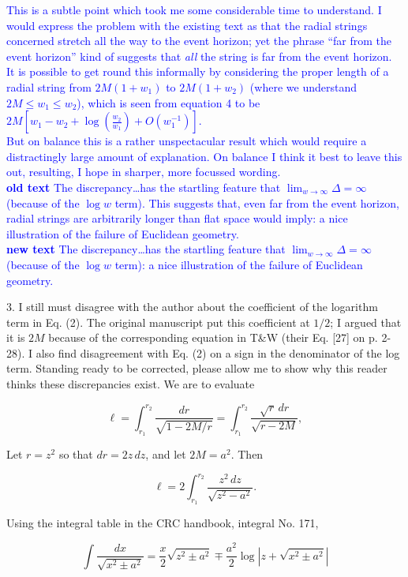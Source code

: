 \documentclass[12pt]{article}
\begin{document}
\textcolor{blue}{This is a subtle point which took me some
  considerable time to understand.  I would express the problem with
  the existing text as that the radial strings concerned stretch all
  the way to the event horizon; yet the phrase ``far from the event
  horizon'' kind of suggests that {\em all} the string is far from the
  event horizon.\\ It is possible to get round this informally by
  considering the proper length of a radial string from $2M(1+w_1)$ to
  $2M(1+w_2)$ (where we understand $2M\leq w_1\leq w_2$), which is seen from
  equation 4 to be $2M\left[w_1-w_2 + \log\left(\frac{w_2}{w_1}\right) +
  O(w_1^{-1})\right]$.\\ But on balance this is a rather unspectacular result
  which would require a distractingly large amount of explanation.  On
  balance I think it best to leave this out, resulting, I hope in
  sharper, more focussed wording.
\\ {\bf old text}
The discrepancy\ldots has the startling feature that
$\lim_{w\longrightarrow\infty}\Delta=\infty$ (because of the $\log w$
term).  This suggests that, even far from the event horizon, radial
strings are arbitrarily longer than flat space would imply: a nice
illustration of the failure of Euclidean geometry.
\\ {\bf new text}
The discrepancy\ldots has the startling feature that
$\lim_{w\longrightarrow\infty}\Delta=\infty$ (because of the $\log w$
term): a nice illustration of the failure of Euclidean geometry.
}

3. I still must disagree with the author about the coefficient of the
logarithm term in Eq. (2).  The original manuscript put this
coefficient at $1/2$; I argued that it is $2M$ because of the
corresponding equation in T\&W (their Eq. [27] on p. 2-28).  I also
find disagreement with Eq. (2) on a sign in the denominator of the log
term.  Standing ready to be corrected, please allow me to show why
this reader thinks these discrepancies exist.  We are to evaluate

\[
\ell=\int_{r_1}^{r_2}\frac{dr}{\sqrt{1-2M/r}} =
\int_{r_1}^{r_2}\frac{\sqrt{r}\,dr}{\sqrt{r-2M}},
\]

Let $r=z^2$ so that $dr=2z\,dz$, and let $2M=a^2$.  Then 

\[
\ell=2\int_{r_1}^{r_2} \frac{z^2\,dz}{\sqrt{z^2-a^2}}.
\]

 Using the integral table in the CRC handbook, integral No. 171,

\[
\int\frac{dx}{\sqrt{x^2\pm a^2}}=\frac{x}{2} \sqrt{z^2\pm a^2}
\mp \frac{a^2}{2}\log\left| z+\sqrt{x^2\pm a^2}\right|
\]
\end{document}
